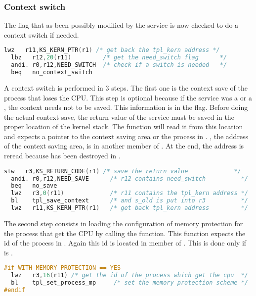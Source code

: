 \subsubsection{Context switch}

The  flag that as been possibly modified by the service is now checked to do a context switch if needed.

\begin{lstlisting}[language=C]
  lwz   r11,KS_KERN_PTR(r1) /* get back the tpl_kern address */
  lbz   r12,20(r11)         /* get the need_switch flag      */
  andi. r0,r12,NEED_SWITCH  /* check if a switch is needed   */
  beq   no_context_switch
\end{lstlisting}

A context switch is performed in 3 steps. The first one is the context save of the process that loses the CPU. This step is optional because if the service was a  or a , the context needs not to be saved. This information is in the  flag. Before doing the actual context save, the return value of the service must be saved in the proper location of the kernel stack. The  function will read it from this location and expects a pointer to the context saving area or the process in . , the address of the context saving area, is in another member of . At the end, the  address is reread because  has been destroyed in . 

\begin{lstlisting}[language=C]
  stw   r3,KS_RETURN_CODE(r1) /* save the return value             */
  andi. r0,r12,NEED_SAVE      /* r12 contains need_switch          */
  beq   no_save
  lwz   r3,0(r11)             /* r11 contains the tpl_kern address */
  bl    tpl_save_context      /* and s_old is put into r3          */
  lwz   r11,KS_KERN_PTR(r1)   /* get back tpl_kern address         */
\end{lstlisting}

The second step consists in loading the configuration of memory protection for the process that get the CPU by calling the  function. This function expects the id of the process in . Again this id is located in member  of . This is done only if  is \YES. 

\begin{lstlisting}[language=C]
#if WITH_MEMORY_PROTECTION == YES
  lwz   r3,16(r11) /* get the id of the process which get the cpu  */
  bl    tpl_set_process_mp     /* set the memory protection scheme */
#endif
\end{lstlisting}

